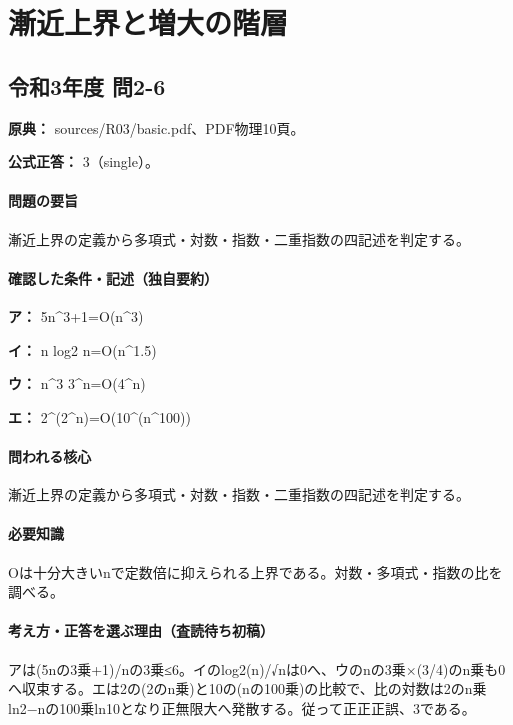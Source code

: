 \section{漸近上界と増大の階層}

\subsection{令和3年度 問2-6}
\label{q:r03-reg-basic-2-6}

\noindent\textbf{原典：} sources/R03/basic.pdf、PDF物理10頁。

\textbf{公式正答：} 3（single）。

\paragraph{問題の要旨} 漸近上界の定義から多項式・対数・指数・二重指数の四記述を判定する。

\paragraph{確認した条件・記述（独自要約）}\mbox{}\par

\noindent\textbf{ア：} 5n\textasciicircum{}3+1=\allowbreak{}O(n\textasciicircum{}3)\par

\noindent\textbf{イ：} n log2 n=\allowbreak{}O(n\textasciicircum{}1.5)\par

\noindent\textbf{ウ：} n\textasciicircum{}3 3\textasciicircum{}n=\allowbreak{}O(4\textasciicircum{}n)\par

\noindent\textbf{エ：} 2\textasciicircum{}(2\textasciicircum{}n)=\allowbreak{}O(10\textasciicircum{}(n\textasciicircum{}100))\par

\paragraph{問われる核心} 漸近上界の定義から多項式・対数・指数・二重指数の四記述を判定する。

\paragraph{必要知識} Oは十分大きいnで定数倍に抑えられる上界である。対数・多項式・指数の比を調べる。

\paragraph{考え方・正答を選ぶ理由（査読待ち初稿）} アは(5nの3乗+1)/nの3乗≤6。イのlog2(n)/√nは0へ、ウのnの3乗×(3/4)のn乗も0へ収束する。エは2の(2のn乗)と10の(nの100乗)の比較で、比の対数は2のn乗ln2−nの100乗ln10となり正無限大へ発散する。従って正正正誤、3である。

